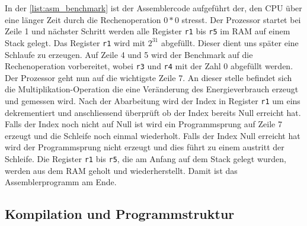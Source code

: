 In der \autoref{list:asm_benchmark} ist der Assemblercode aufgeführt der, den CPU über eine länger Zeit durch die Rechenoperation $0*0$ stresst. Der Prozessor startet bei Zeile 1 und nächster Schritt werden alle Register \texttt{r1} bis \texttt{r5} im RAM auf einem Stack gelegt. Das Register \texttt{r1} wird mit $2^{31}$ abgefüllt. Dieser dient uns später eine Schlaufe zu erzeugen. Auf Zeile 4 und 5 wird der Benchmark auf die Rechenoperation vorbereitet, wobei \texttt{r3} und \texttt{r4} mit der Zahl 0 abgefüllt werden. Der Prozessor geht nun auf die wichtigste Zeile 7. An dieser stelle befindet sich die Multiplikation-Operation die eine Veränderung des Energieverbrauch erzeugt und gemessen wird. Nach der Abarbeitung wird der Index in Register \texttt{r1} um eins dekrementiert und anschliessend überprüft ob der Index bereits Null erreicht hat. Falls der Index noch nicht auf Null ist wird ein Programmsprung auf Zeile 7 erzeugt und die Schleife noch einmal wiederholt. Falls der Index Null erreicht hat wird der Programmsprung nicht erzeugt und dies führt zu einem austritt der Schleife. Die Register  \texttt{r1} bis \texttt{r5}, die am Anfang auf dem Stack gelegt wurden, werden aus dem RAM geholt und wiederherstellt. Damit ist das Assemblerprogramm am Ende.
\par






\subsection{Kompilation und Programmstruktur}


